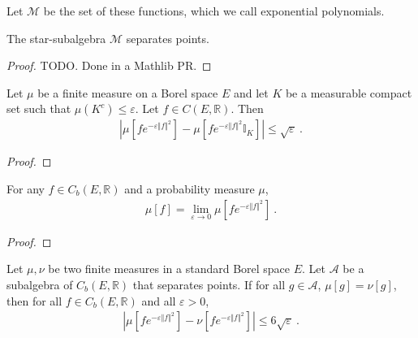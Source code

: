 Let $\mathcal M$ be the set of these functions, which we call exponential polynomials.

\begin{lemma}\label{lem:separates_points_expPoly}
\leanok
The star-subalgebra $\mathcal M$ separates points.
\end{lemma}

\begin{proof}
TODO. Done in a Mathlib PR.
\end{proof}


\begin{lemma}\label{lem:integral_restrict_compact}
\mathlibok
{}
Let $\mu$ be a finite measure on a Borel space $E$ and let $K$ be a measurable compact set such that $\mu(K^c) \le \varepsilon$. Let $f \in C(E, \mathbb{R})$. Then
\begin{align*}
\left\vert \mu[fe^{-\varepsilon \Vert f \Vert^2}] - \mu[f e^{-\varepsilon \Vert f \Vert^2} \mathbb{I}_K] \right\vert
\le \sqrt{\varepsilon} \: .
\end{align*}
\end{lemma}

\begin{proof}\leanok
\end{proof}


\begin{lemma}\label{lem:introduce_exponential}
\mathlibok
{}
For any $f \in C_b(E, \mathbb{R})$ and a probability measure $\mu$,
\begin{align*}
\mu[f] 
= \lim_{\varepsilon \to 0} \mu\left[f e^{-\varepsilon \Vert f \Vert^2} \right]
\: .
\end{align*}
\end{lemma}

\begin{proof}\leanok
\end{proof}


\begin{lemma}\label{lem:dist_integral_mulExpNegMulSq_comp_le}
\mathlibok
{}
Let $\mu, \nu$ be two finite measures in a standard Borel space $E$. Let $\mathcal{A}$ be a subalgebra of $C_b(E, \mathbb{R})$ that separates points.
If for all $g \in \mathcal A$, $\mu[g] = \nu[g]$, then for all $f \in C_b(E, \mathbb{R})$ and all $\varepsilon > 0$,
\begin{align*}
    \left\vert \mu[fe^{-\varepsilon \Vert f \Vert^2}] - \nu[f e^{-\varepsilon \Vert f \Vert^2}] \right\vert
    \le 6\sqrt{\varepsilon} \: .
\end{align*}
\end{lemma}

